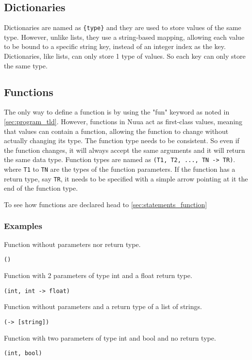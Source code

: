 \subsection{Dictionaries}

Dictionaries are named as \texttt{\{type\}} and they are used to store values of the same type. However, unlike lists, they
use a string-based mapping, allowing each value to be bound to a specific string key, instead of an integer index as the key.
Dictionaries, like lists, can only store 1 type of values. So each key can only store the same type.

\subsection{Functions}

The only way to define a function is by using the "fun" keyword as noted in \autoref{sec:program_tld}. However, functions in Nuua
act as first-class values, meaning that values can contain a function, allowing the function to change without actually changing its type.
The function type needs to be consistent. So even if the function changes, it will always accept the same arguments and it will return the same data type.
Function types are named as \texttt{(T1, T2, ..., TN -> TR)}. where \texttt{T1} to \texttt{TN} are the types of the function parameters.
If the function has a return type, say \texttt{TR}, it needs to be specified with a simple arrow pointing at it the end of the function type.

To see how functions are declared head to \autoref{sec:statements_function}

\subsubsection{Examples}

Function without parameters nor return type.
\begin{lstlisting}
()
\end{lstlisting}
Function with 2 parameters of type int and a float return type.
\begin{lstlisting}
(int, int -> float)
\end{lstlisting}
Function without parameters and a return type of a list of strings.
\begin{lstlisting}
(-> [string])
\end{lstlisting}
Function with two parameters of type int and bool and no return type.
\begin{lstlisting}
(int, bool)
\end{lstlisting}

